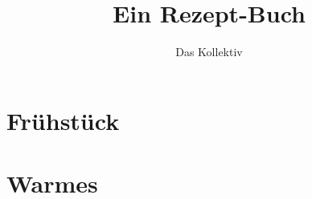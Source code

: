 \documentclass[a4paper, 11pt]{article}
\begin{document}
    \title{Ein Rezept-Buch}
    \author{Das Kollektiv}
    \maketitle
    \tableofcontents

    \vspace{5em}

    \section{Frühstück}

    
    
    
    \section{Warmes}
    
    

    
    


\end{document}
